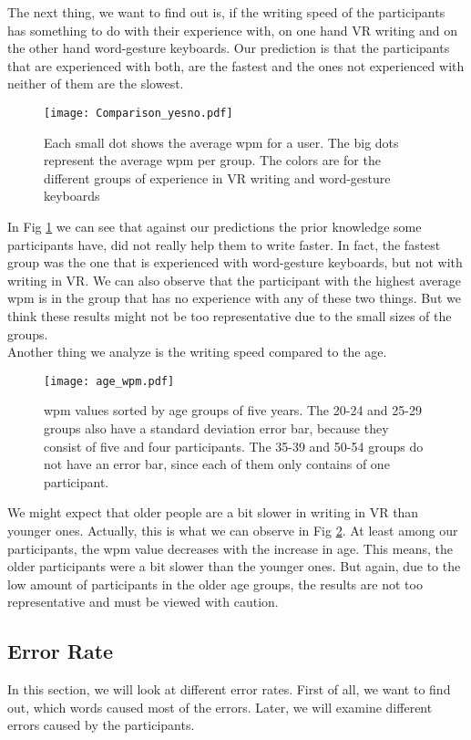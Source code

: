 The next thing, we want to find out is, if the writing speed of the participants has something to do with their experience with, on one hand VR writing and on the other hand word-gesture keyboards. Our prediction is that the participants that are experienced with both, are the fastest and the ones not experienced with neither of them are the slowest.\\
\begin{figure}[H]
    \centering
    \texttt{[image: Comparison\_yesno.pdf]}
    \caption{Each small dot shows the average wpm for a user. The big dots represent the average wpm per group. The colors are for the different groups of experience in VR writing and word-gesture keyboards}
    \label{fig:WPM_yesno}
\end{figure}
In Fig \ref{fig:WPM_yesno} we can see that against our predictions the prior knowledge some participants have, did not really help them to write faster. In fact, the fastest group was the one that is experienced with word-gesture keyboards, but not with writing in VR. We can also observe that the participant with the highest average wpm is in the group that has no experience with any of these two things. But we think these results might not be too representative due to the small sizes of the groups.\\

Another thing we analyze is the writing speed compared to the age.
\begin{figure}[H]
    \centering
    \texttt{[image: age\_wpm.pdf]}
    \caption{wpm values sorted by age groups of five years. The 20-24 and 25-29 groups also have a standard deviation error bar, because they consist of five and four participants. The 35-39 and 50-54 groups do not have an error bar, since each of them only contains of one participant.}
    \label{fig:WPM_age}
\end{figure}

We might expect that older people are a bit slower in writing in VR than younger ones. Actually, this is what we can observe in Fig \ref{fig:WPM_age}. At least among our participants, the wpm value decreases with the increase in age. This means, the older participants were a bit slower than the younger ones. But again, due to the low amount of participants in the older age groups, the results are not too representative and must be viewed with caution.

\subsection{Error Rate}
In this section, we will look at different error rates. First of all, we want to find out, which words caused most of the errors. Later, we will examine different errors caused by the participants.

